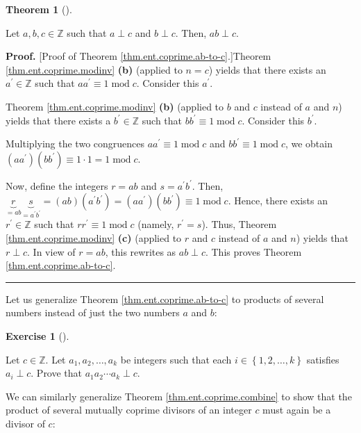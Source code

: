 \documentclass[numbers=enddot,12pt,final,onecolumn,notitlepage]{scrartcl}%
\newcounter{exer}
\numberwithin{exer}{subsection}
\theoremstyle{definition}
\newtheorem{theo}{Theorem}[subsection]
\newenvironment{theorem}[1][]
{\begin{theo}[#1]\begin{leftbar}}
{\end{leftbar}\end{theo}}
\newtheorem{exmp}[exer]{Exercise}
\newenvironment{exercise}[1][]
{\begin{exmp}[#1]\begin{leftbar}}
{\end{leftbar}\end{exmp}}
\newenvironment{proof}[1][Proof]{\noindent\textbf{#1.} }{\ \rule{0.5em}{0.5em}}
\begin{document}
\begin{theorem}
\label{thm.ent.coprime.ab-to-c}Let $a,b,c\in\mathbb{Z}$ such that $a\perp c$
and $b\perp c$. Then, $ab\perp c$.
\end{theorem}

\begin{proof}
[Proof of Theorem \ref{thm.ent.coprime.ab-to-c}.]Theorem
\ref{thm.ent.coprime.modinv} \textbf{(b)} (applied to $n=c$) yields that there
exists an $a^{\prime}\in\mathbb{Z}$ such that $aa^{\prime}\equiv
1\operatorname{mod}c$. Consider this $a^{\prime}$.

Theorem \ref{thm.ent.coprime.modinv} \textbf{(b)} (applied to $b$ and $c$
instead of $a$ and $n$) yields that there exists a $b^{\prime}\in\mathbb{Z}$
such that $bb^{\prime}\equiv1\operatorname{mod}c$. Consider this $b^{\prime}$.

Multiplying the two congruences $aa^{\prime}\equiv1\operatorname{mod}c$ and
$bb^{\prime}\equiv1\operatorname{mod}c$, we obtain $\left(  aa^{\prime
}\right)  \left(  bb^{\prime}\right)  \equiv1\cdot1=1\operatorname{mod}c$.

Now, define the integers $r=ab$ and $s=a^{\prime}b^{\prime}$. Then,
$\underbrace{r}_{=ab}\underbrace{s}_{=a^{\prime}b^{\prime}}=\left(  ab\right)
\left(  a^{\prime}b^{\prime}\right)  =\left(  aa^{\prime}\right)  \left(
bb^{\prime}\right)  \equiv1\operatorname{mod}c$. Hence, there exists an
$r^{\prime}\in\mathbb{Z}$ such that $rr^{\prime}\equiv1\operatorname{mod}c$
(namely, $r^{\prime}=s$). Thus, Theorem \ref{thm.ent.coprime.modinv}
\textbf{(c)} (applied to $r$ and $c$ instead of $a$ and $n$) yields that
$r\perp c$. In view of $r=ab$, this rewrites as $ab\perp c$. This proves
Theorem \ref{thm.ent.coprime.ab-to-c}.
\end{proof}

Let us generalize Theorem \ref{thm.ent.coprime.ab-to-c} to products of several
numbers instead of just the two numbers $a$ and $b$:

\begin{exercise}
\label{exe.ent.coprime.ab-to-ck}Let $c\in\mathbb{Z}$. Let $a_{1},a_{2}%
,\ldots,a_{k}$ be integers such that each $i\in\left\{  1,2,\ldots,k\right\}
$ satisfies $a_{i}\perp c$. Prove that $a_{1}a_{2}\cdots a_{k}\perp c$.
\end{exercise}

We can similarly generalize Theorem \ref{thm.ent.coprime.combine} to show that
the product of several mutually coprime divisors of an integer $c$ must again
be a divisor of $c$:
\end{document}
